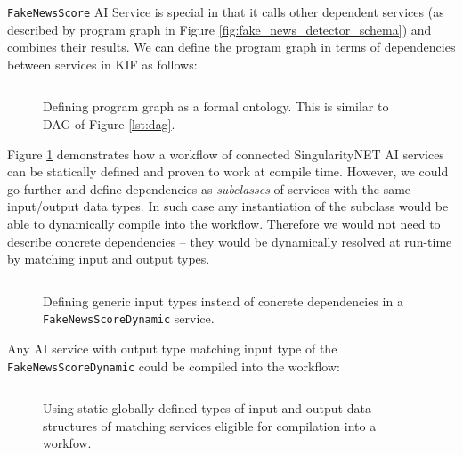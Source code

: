 \documentclass[]{report}
\begin{document}
\texttt{FakeNewsScore} AI Service is special in that it calls
other dependent services (as described by program graph in Figure
\ref{fig:fake_news_detector_schema}) and combines their results.
We can define the program graph in
terms of dependencies between services in KIF as follows:

\begin{figure}[H]
  \captionsetup{width=0.8\linewidth}
  \inputminted[firstline=1, lastline=9, linenos,tabsize=2,breaklines, fontsize=\small]{scm}{../../../ontology/FakeNewsScore.kif}
  \vspace{-0.3cm}
  \caption{\label{fig:serviceDependencies}Defining program graph as a formal ontology. This is similar to DAG of Figure \ref{lst:dag}.}
\end{figure}

Figure \ref{fig:serviceDependencies} demonstrates how a workflow of connected
SingularityNET AI services can be statically defined and proven to work at
compile time. However, we could go further and define dependencies as
\textit{subclasses} of services with the same input/output data types. In such case
any instantiation of the subclass would be able to dynamically compile into the
workflow. Therefore we would not need to describe concrete dependencies -- they
would be dynamically resolved at run-time by matching input and output types.

\begin{figure}[H]
  \captionsetup{width=0.8\linewidth}
  \inputminted[firstline=1, lastline=22, linenos,tabsize=2,breaklines, fontsize=\small]{scm}{../../../ontology/FakeNewsScoreDynamic.kif}
  \vspace{-0.3cm}
  \caption{\label{fig:fakeNewsScoreDynamic}Defining generic input types instead
  of concrete dependencies in a \texttt{FakeNewsScoreDynamic} service.}
\end{figure}

Any AI service with output type matching input type of the
\texttt{FakeNewsScoreDynamic} could be compiled into the workflow:

\begin{figure}[H]
  \captionsetup{width=0.8\linewidth}
  \inputminted[firstline=1, lastline=4, linenos,tabsize=2,breaklines, fontsize=\small]{scm}{../../../ontology/uclnlpDynamic.kif}
  \vspace{-0.3cm}
  \caption{\label{fig:uclnlpDynamicOne}Using static globally defined types of
  input and output data structures of matching services eligible for
  compilation into a workfow.}
\end{figure}
\end{document}
